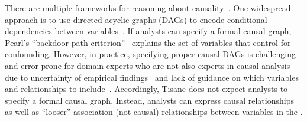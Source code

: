 There are multiple frameworks for
reasoning about causality~\cite{rubin2004teaching,pearl1995causal}. One
widespread approach is to use directed acyclic graphs (DAGs) to encode
conditional dependencies between
variables~\cite{pearl1995doCalculus,greenland1999causal,spirtes1994conditional,spirtes1996using}.
If analysts can specify a formal causal graph, Pearl's ``backdoor path
criterion''~\cite{pearl1995causal,pearl2000models} explains the set of variables
that control for confounding. However, in practice, specifying proper causal
DAGs is challenging and error-prone for domain experts who are not also experts
in causal analysis~\cite{suzuki2020causal} due to uncertainty of empirical
findings~\cite{suzuki2018mechanisms} and lack of guidance on which variables and
relationships to include~\cite{velentgas2013developing}. Accordingly, Tisane
does not expect analysts to specify a formal causal graph. Instead, analysts can
express causal relationships as well as ``looser'' association (not causal)
relationships between variables in the \SDSLlong.
